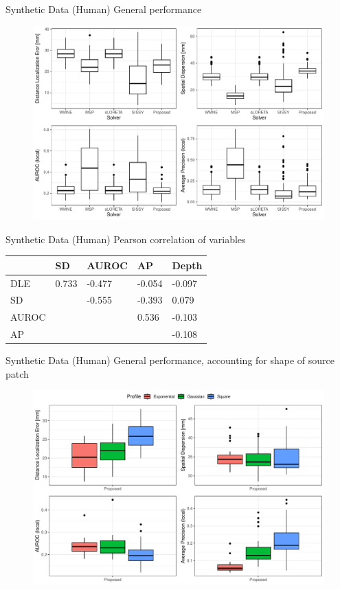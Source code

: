 \documentclass[progressbar=head]{beamer}
\begin{document}
\begin{frame}{Synthetic Data (Human)}
General performance
\begin{figure}
    \centering
    \includegraphics[width=0.7\linewidth]{img_stats/P_plot_EvalMetrics_Protocol04_30ALL.pdf}
\end{figure}
\end{frame}

\begin{frame}{Synthetic Data (Human)}
Pearson correlation of variables
\begin{table}[]
\centering
\begin{tabular}{@{}lllll@{}}
\toprule
      & SD    & AUROC & AP    & Depth  \\
\midrule
DLE   & 0.733 & -0.477 & -0.054 & -0.097 \\
SD    &       & -0.555 & -0.393 & 0.079  \\
AUROC &       &        & 0.536  & -0.103 \\
AP    &       &        &        & -0.108 \\
\bottomrule
\end{tabular}
\end{table}
\end{frame}

\begin{frame}{Synthetic Data (Human)}
General performance, accounting for shape of source patch
\begin{figure}
    \centering
    \includegraphics[width=0.7\linewidth]{img_stats/P_shape_EvalMetrics_Protocol04_30ALL.pdf}
\end{figure}
\end{frame}
\end{document}
